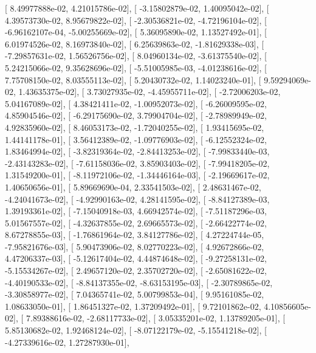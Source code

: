 \documentclass{article}
\begin{document}
       [  8.49977888e-02,   4.21015786e-02],
       [ -3.15802879e-02,   1.40095042e-02],
       [  4.39573730e-02,   8.95679822e-02],
       [ -2.30536821e-02,  -4.72196104e-02],
       [ -6.96162107e-04,  -5.00255669e-02],
       [  5.36095890e-02,   1.13527492e-01],
       [  6.01974526e-02,   8.16973840e-02],
       [  6.25639863e-02,  -1.81629338e-03],
       [ -7.29857631e-02,   1.56526756e-02],
       [  8.04960134e-02,  -3.61375540e-02],
       [  5.24215066e-02,   9.35628696e-02],
       [ -5.51005985e-03,  -4.01238616e-02],
       [  7.75708150e-02,   8.03555113e-02],
       [  5.20430732e-02,   1.14023240e-01],
       [  9.59294069e-02,   1.43635375e-02],
       [  3.73027935e-02,  -4.45955711e-02],
       [ -2.72006203e-02,   5.04167089e-02],
       [  4.38421411e-02,  -1.00952073e-02],
       [ -6.26009595e-02,   4.85904546e-02],
       [ -6.29175690e-02,   3.79904704e-02],
       [ -2.78989949e-02,   4.92835960e-02],
       [  8.46053173e-02,  -1.72040255e-02],
       [  1.93415695e-02,   1.44141178e-01],
       [  3.56412389e-02,  -1.09776903e-02],
       [ -6.12552324e-02,   1.83464994e-02],
       [ -3.82319364e-02,  -2.84413253e-02],
       [ -7.99833440e-03,  -2.43143283e-02],
       [ -7.61158036e-02,   3.85903403e-02],
       [ -7.99418205e-02,   1.31549200e-01],
       [ -8.11972106e-02,  -1.34446164e-03],
       [ -2.19669617e-02,   1.40650656e-01],
       [  5.89669690e-04,   2.33541503e-02],
       [  2.48631467e-02,  -4.24041673e-02],
       [ -4.92990163e-02,   4.28141595e-02],
       [ -8.84127389e-03,   1.39193361e-02],
       [ -7.15040918e-03,   4.66942574e-02],
       [ -7.51187296e-03,   5.01567557e-02],
       [ -4.32637855e-02,   2.69665573e-02],
       [ -2.66422774e-02,   8.67278855e-03],
       [ -1.76861964e-02,   3.84127786e-02],
       [  4.27224744e-05,  -7.95821676e-03],
       [  5.90473906e-02,   8.02770223e-02],
       [  4.92672866e-02,   4.47206337e-03],
       [ -5.12617404e-02,   4.44874648e-02],
       [ -9.27258131e-02,  -5.15534267e-02],
       [  2.49657120e-02,   2.35702720e-02],
       [ -2.65081622e-02,  -4.40190533e-02],
       [ -8.84137355e-02,  -8.63153195e-03],
       [ -2.30789865e-02,  -3.30858977e-02],
       [  7.04365741e-02,   5.00799853e-04],
       [  9.95161085e-02,   1.08633050e-01],
       [  1.86451327e-02,   1.37209492e-01],
       [  9.72101862e-02,   4.10856605e-02],
       [  7.89388616e-02,  -2.68117733e-02],
       [  3.05335201e-02,   1.13789205e-01],
       [  5.85130682e-02,   1.92468124e-02],
       [ -8.07122179e-02,  -5.15541218e-02],
       [ -4.27339616e-02,   1.27287930e-01],
\end{document}
